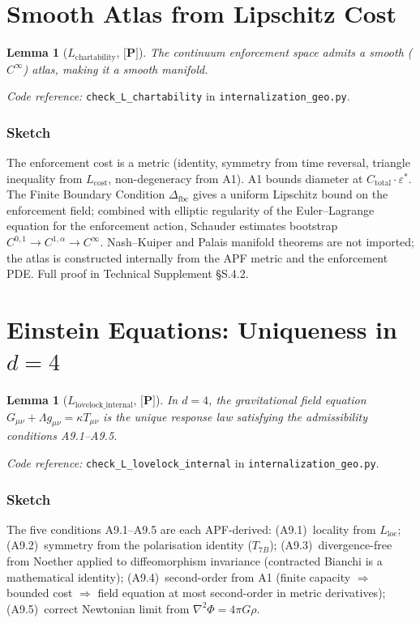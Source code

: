 \documentclass[11pt]{article}
\newcommand{\coderef}[2]{\smallskip\noindent\textit{Code reference:} \texttt{#1} in \texttt{#2}.}
\newcommand{\epitag}[1]{\textbf{[#1]}}
\newtheorem{lemma}[theorem]{Lemma}
\theoremstyle{definition}
\begin{document}
\section{Smooth Atlas from Lipschitz Cost}\label{sec:atlas}

\begin{lemma}[$L_{\mathrm{chartability}}$, $\epitag{P}$]
The continuum enforcement space admits a smooth ($C^\infty$) atlas, making it a smooth manifold.
\end{lemma}

\coderef{check\_L\_chartability}{internalization\_geo.py}

\subsubsection*{Sketch}
The enforcement cost is a metric (identity, symmetry from time reversal, triangle inequality from $L_{\mathrm{cost}}$, non-degeneracy from A1).  A1 bounds diameter at $C_{\mathrm{total}} \cdot \varepsilon^*$.  The Finite Boundary Condition $\Delta_{\mathrm{fbc}}$ gives a uniform Lipschitz bound on the enforcement field; combined with elliptic regularity of the Euler--Lagrange equation for the enforcement action, Schauder estimates bootstrap $C^{0,1} \to C^{1,\alpha} \to C^\infty$.  Nash--Kuiper and Palais manifold theorems are not imported; the atlas is constructed internally from the APF metric and the enforcement PDE.  Full proof in Technical Supplement \S S.4.2.

\section{Einstein Equations: Uniqueness in $d=4$}\label{sec:einstein}

\begin{lemma}[$L_{\mathrm{lovelock\_internal}}$, $\epitag{P}$]
In $d = 4$, the gravitational field equation $G_{\mu\nu} + \Lambda g_{\mu\nu} = \kappa T_{\mu\nu}$ is the unique response law satisfying the admissibility conditions A9.1--A9.5.
\end{lemma}

\coderef{check\_L\_lovelock\_internal}{internalization\_geo.py}

\subsubsection*{Sketch}
The five conditions A9.1--A9.5 are each APF-derived: (A9.1)~locality from $L_{\mathrm{loc}}$; (A9.2)~symmetry from the polarisation identity ($T_{7B}$); (A9.3)~divergence-free from Noether applied to diffeomorphism invariance (contracted Bianchi is a mathematical identity); (A9.4)~second-order from A1 (finite capacity $\Rightarrow$ bounded cost $\Rightarrow$ field equation at most second-order in metric derivatives); (A9.5)~correct Newtonian limit from $\nabla^2 \Phi = 4\pi G \rho$.
\end{document}
